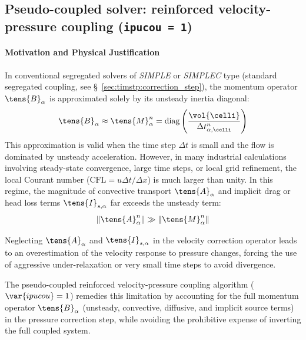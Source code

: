 
\subsection{Pseudo-coupled solver: reinforced velocity-pressure coupling (\texttt{ipucou = 1})}\label{sec:timstp:reinforced_coupling}

\paragraph{Motivation and Physical Justification}
In conventional segregated solvers of \textit{SIMPLE} or \textit{SIMPLEC} type
(standard segregated coupling, see \S~\ref{sec:timstp:correction_step}),
the momentum operator $\tens{B}_\alpha$ is approximated solely by its unsteady inertia diagonal:
\begin{equation}
  \tens{B}_\alpha \approx \tens{M}_\alpha^n = \text{diag} \left( \frac{\vol{\celli}}{\Delta t_{\alpha,\celli}^n} \right)
\end{equation}
This approximation is valid when the time step $\Delta t$ is small and the flow is
dominated by unsteady acceleration. However, in many industrial calculations
involving steady-state convergence, large time steps, or local grid refinement, the
local Courant number ($\text{CFL} = u \Delta t / \Delta x$) is much larger than unity.
In this regime, the magnitude of convective transport $\tens{A}_\alpha$ and implicit
drag or head loss terms $\tens{I}_{s,\alpha}$ far exceeds the unsteady term:
\begin{equation}
  \| \tens{A}_\alpha^n \| \gg \| \tens{M}_\alpha^n \|
\end{equation}

Neglecting $\tens{A}_\alpha$ and $\tens{I}_{s,\alpha}$ in the velocity correction
operator leads to an overestimation of the velocity response to pressure changes,
forcing the use of aggressive under-relaxation or very small time steps to avoid
divergence.

The pseudo-coupled reinforced velocity-pressure coupling algorithm ($\var{ipucou} = 1$)
remedies this limitation by accounting for the full momentum operator $\tens{B}_\alpha$
(unsteady, convective, diffusive, and implicit source terms) in the pressure
correction step, while avoiding the prohibitive expense of inverting the full
coupled system.

